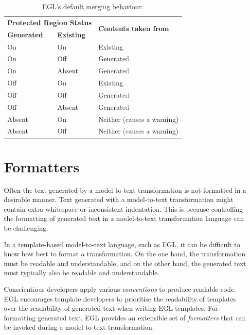 \begin{table}[htbp]
  \begin{center}
  \begin{tabular}{|l|l|l|}
  \hline
  \multicolumn{2}{|l|}{\textbf{Protected Region Status}} & \multirow{2}{*}{\textbf{Contents taken from}} \\
  \textbf{Generated} & \textbf{Existing} & \\
  \hline
  On & On     & Existing  \\
  On & Off    & Generated \\
  On & Absent & Generated \\
  \hline
  Off & On     & Existing  \\
  Off & Off    & Generated \\
  Off & Absent & Generated \\
  \hline
  Absent & On  & Neither (causes a warning) \\
  Absent & Off & Neither (causes a warning) \\
  \hline
  \end{tabular}
  \end{center}
\caption{EGL's default merging behaviour.}
\label{tab:merging}
\end{table}

\section{Formatters}
\label{sec:formatters}
Often the text generated by a model-to-text transformation is not formatted 
in a desirable  manner. Text generated with a model-to-text transformation
might contain extra whitespace or inconsistent indentation. This is because controlling the formatting of generated text in a model-to-text transformation language can be challenging.

In a template-based model-to-text language, such as EGL, it can be difficult 
to know how best to format a transformation. On the one hand, the transformation 
must be readable and understandable, and on the other hand, the generated text 
must typically also be readable and understandable. 

Conscientious developers apply various \emph{conventions} to produce
readable code. EGL encourages template developers to prioritise the
readability of templates over the readability of generated text when 
writing EGL templates. For formatting generated text, EGL provides an 
extensible set of \textit{formatters} that can be invoked during
a model-to-text transformation.

